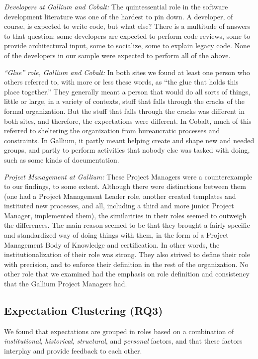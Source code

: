 \documentclass[10pt, conference, compsocconf]{IEEEtran}
\begin{document}
\emph{Developers at Gallium and Cobalt:} The quintessential role in the software development literature was one of the hardest to pin down. A developer, of course, is expected to write code, but what else? There is a multitude of answers to that question: some developers are expected to perform code reviews, some to provide architectural input, some to socialize, some to explain legacy code. None of the developers in our sample were expected to perform all of the above.

\emph{``Glue'' role, Gallium and Cobalt:} In both sites we found at least one person who others referred to, with more or less these words, as ``the glue that holds this place together.'' They generally meant a person that would do all sorts of things, little or large, in a variety of contexts, stuff that falls through the cracks of the formal organization. But the stuff that falls through the cracks was different in both sites, and therefore, the expectations were different. In Cobalt, much of this referred to sheltering the organization from bureaucratic processes and constraints. In Gallium, it partly meant helping create and shape new and needed groups, and partly to perform activities that nobody else was tasked with doing, such as some kinds of documentation.

\emph{Project Management at Gallium:} These Project Managers were a counterexample to our findings, to some extent. Although there were distinctions between them (one had a Project Management Leader role, another created templates and instituted new processes, and all, including a third and more junior Project Manager, implemented them), the similarities in their roles seemed to outweigh the differences. The main reason seemed to be that they brought a fairly specific and standardized way of doing things with them, in the form of a Project Management Body of Knowledge and certification. In other words, the institutionalization of their role was strong. They also strived to define their role with precision, and to enforce their definition in the rest of the organization. No other role that we examined had the emphasis on role definition and consistency that the Gallium Project Managers had.


\subsection{Expectation Clustering (RQ3)}

We found that expectations are grouped in roles based on a combination of \emph{institutional}, \emph{historical}, \emph{structural}, and \emph{personal} factors, and that these factors interplay and provide feedback to each other. 
\end{document}
